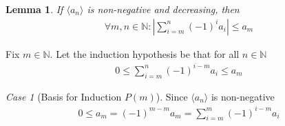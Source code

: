 \documentclass{amsart}
\numberwithin{equation}{section}
\let\oldendproof\endproof
\renewenvironment{proof}[1][\proofname]{%
  \setcounter{case}{0}
  \setcounter{step}{0}
  \oldproof[#1]%
}{\oldendproof}
\theoremstyle{plain}
\newtheorem{lemma}[theorem]{Lemma}
\theoremstyle{definition}
\theoremstyle{remark}
\newtheorem{case}{Case}
\begin{document}
\begin{lemma}
  If $\langle a_n \rangle$ is non-negative and decreasing, then
  \begin{align}
    \forall m,n\in\mathbb{N}: \left| \sum_{i=m}^n  (-1)^{i} a_i \right| \leq a_m
  \end{align}
\end{lemma}
\begin{proof}
  Fix $m\in\mathbb{N}$. Let the induction hypothesis be that for all $n\in\mathbb{N}$
  \begin{align}
    0 \leq \sum^n_{i=m} (-1)^{i-m}a_i \leq a_m
  \end{align}
  \begin{case}[Basis for Induction $P(m)$]
    Since $\langle a_n \rangle$ is non-negative
    \begin{align}
      0 \leq a_m = (-1)^{m-m} a_m = \sum^m_{i=m} (-1)^{i-m} a_i
    \end{align}
  \end{case}
  

\end{proof}
\end{document}
